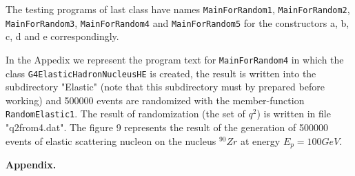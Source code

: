 \documentclass[12pt]{article}
\begin{document}
  The testing programs of last class have names {\tt MainForRandom1},
{\tt MainFor\-Ran\-dom2}, {\tt MainForRandom3}, {\tt MainForRandom4} 
and {\tt MainForRandom5} 
for the constructors a, b, c, d and e correspondingly. 

In the Appedix we represent the  program text for 
{\tt MainForRandom4} in which the class
{\tt G4ElasticHadronNucleusHE} is created, 
the result is written into
the subdirectory "Elastic" (note that this subdirectory must
by prepared before working)  and 500000 events are 
randomized with the member-function {\tt RandomElastic1}. 
The result of randomization (the set of $q^2$) 
is written in file "q2from4.dat".
The figure 9 represents the result of the generation of
500000 events of elastic scattering nucleon 
on the nucleus $^{90}Zr$ at energy $E_p=100 GeV$.
\vspace{2ex}

{\bf  Appendix.}
\end{document}
